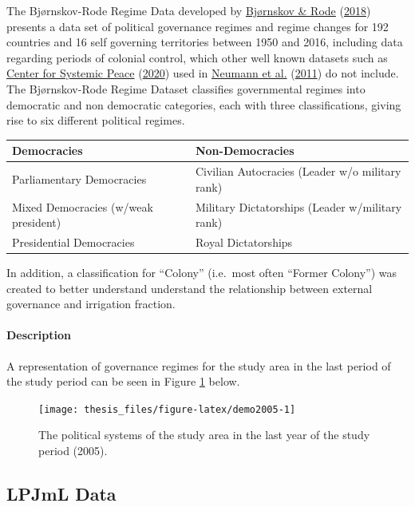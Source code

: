 \documentclass[12pt,twoside]{reedthesis}
\begin{document}
The Bjørnskov-Rode Regime Data developed by \protect\hyperlink{ref-bjornskovRegimeTypesRegime2018}{Bjørnskov \& Rode} (\protect\hyperlink{ref-bjornskovRegimeTypesRegime2018}{2018}) presents a data set of political governance regimes and regime changes for 192 countries and 16 self governing territories between 1950 and 2016, including data regarding periods of colonial control, which other well known datasets such as \protect\hyperlink{ref-centerforsystemicpeacePolityProjectPolity2020}{Center for Systemic Peace} (\protect\hyperlink{ref-centerforsystemicpeacePolityProjectPolity2020}{2020}) used in \protect\hyperlink{ref-neumannExploringGlobalIrrigation2011}{Neumann et al.} (\protect\hyperlink{ref-neumannExploringGlobalIrrigation2011}{2011}) do not include. The Bjørnskov-Rode Regime Dataset classifies governmental regimes into democratic and non democratic categories, each with three classifications, giving rise to six different political regimes.
\begin{longtable}[]{@{}
  >{\raggedright\arraybackslash}p{}
  >{\raggedright\arraybackslash}p{}@{}}
\toprule
Democracies & Non-Democracies \\
\midrule
\endhead
Parliamentary Democracies & Civilian Autocracies (Leader w/o military rank) \\
Mixed Democracies (w/weak president) & Military Dictatorships (Leader w/military rank) \\
Presidential Democracies & Royal Dictatorships \\
\bottomrule
\end{longtable}
In addition, a classification for ``Colony'' (i.e.~most often ``Former Colony'') was created to better understand understand the relationship between external governance and irrigation fraction.

\hypertarget{description-1}{%
\paragraph{Description}\label{description-1}}

A representation of governance regimes for the study area in the last period of the study period can be seen in Figure \ref{fig:demo2005} below.
\begin{figure}

{\centering \texttt{[image: thesis\_files/figure-latex/demo2005-1]} 

}

\caption[Governance regimes of the study area in 2005.]{The political systems of the study area in the last year of the study period (2005). }\label{fig:demo2005}
\end{figure}
\hypertarget{lpjml-data}{%
\subsection{LPJmL Data}\label{lpjml-data}}
\end{document}
